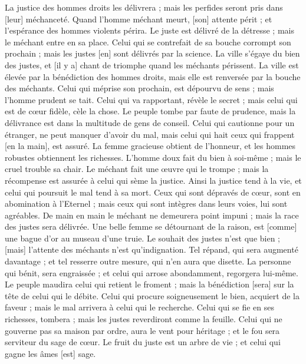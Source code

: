 \begin{multicols}{2}
La justice des hommes droits les délivrera ; mais les perfides seront pris dans [leur] méchanceté.
Quand l'homme méchant meurt, [son] attente périt ; et l'espérance des hommes violents périra.
Le juste est délivré de la détresse ; mais le méchant entre en sa place.
Celui qui se contrefait de sa bouche corrompt son prochain ; mais les justes [en] sont délivrés par la science.
La ville s'égaye du bien des justes, et [il y a] chant de triomphe quand les méchants périssent.
La ville est élevée par la bénédiction des hommes droits, mais elle est renversée par la bouche des méchants.
Celui qui méprise son prochain, est dépourvu de sens ; mais l'homme prudent se tait.
Celui qui va rapportant, révèle le secret ; mais celui qui est de cœur fidèle, cèle la chose.
Le peuple tombe par faute de prudence, mais la délivrance est dans la multitude de gens de conseil.
Celui qui cautionne pour un étranger, ne peut manquer d'avoir du mal, mais celui qui hait ceux qui frappent [en la main], est assuré.
La femme gracieuse obtient de l'honneur, et les hommes robustes obtiennent les richesses.
L'homme doux fait du bien à soi-même ; mais le cruel trouble sa chair.
Le méchant fait une œuvre qui le trompe ; mais la récompense est assurée à celui qui sème la justice.
Ainsi la justice tend à la vie, et celui qui poursuit le mal tend à sa mort.
Ceux qui sont dépravés de cœur, sont en abomination à l'Eternel ; mais ceux qui sont intègres dans leurs voies, lui sont agréables.
De main en main le méchant ne demeurera point impuni ; mais la race des justes sera délivrée.
Une belle femme se détournant de la raison, est [comme] une bague d'or au museau d'une truie.
Le souhait des justes n'est que bien ; [mais] l'attente des méchants n'est qu'indignation.
Tel répand, qui sera augmenté davantage ; et tel resserre outre mesure, qui n'en aura que disette.
La personne qui bénit, sera engraissée ; et celui qui arrose abondamment, regorgera lui-même.
Le peuple maudira celui qui retient le froment ; mais la bénédiction [sera] sur la tête de celui qui le débite.
Celui qui procure soigneusement le bien, acquiert de la faveur ; mais le mal arrivera à celui qui le recherche.
Celui qui se fie en ses richesses, tombera ; mais les justes reverdiront comme la feuille.
Celui qui ne gouverne pas sa maison par ordre, aura le vent pour héritage ; et le fou sera serviteur du sage de cœur.
Le fruit du juste est un arbre de vie ; et celui qui gagne les âmes [est] sage.

\end{multicols}
